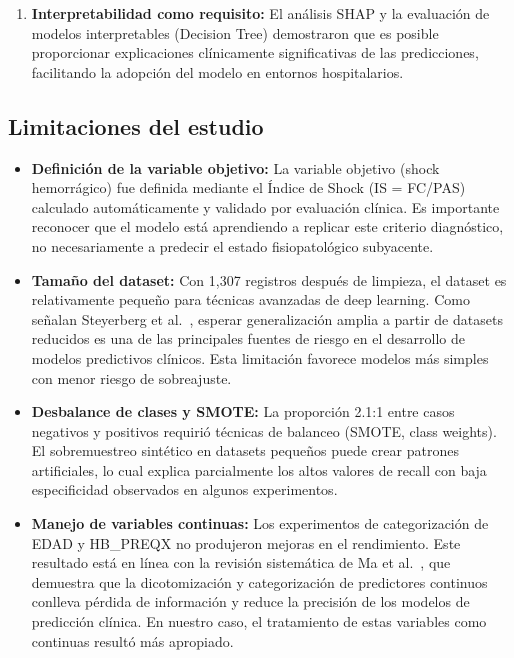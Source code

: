 \documentclass[12pt, letterpaper]{article}
\begin{document}
\begin{enumerate}
    \item \textbf{Interpretabilidad como requisito:} El análisis SHAP y la evaluación de modelos interpretables (Decision Tree) demostraron que es posible proporcionar explicaciones clínicamente significativas de las predicciones, facilitando la adopción del modelo en entornos hospitalarios.
\end{enumerate}

\subsection{Limitaciones del estudio}

\begin{itemize}
    \item \textbf{Definición de la variable objetivo:} La variable objetivo (shock hemorrágico) fue definida mediante el Índice de Shock (IS = FC/PAS) calculado automáticamente y validado por evaluación clínica. Es importante reconocer que el modelo está aprendiendo a replicar este criterio diagnóstico, no necesariamente a predecir el estado fisiopatológico subyacente.
    
    \item \textbf{Tamaño del dataset:} Con 1,307 registros después de limpieza, el dataset es relativamente pequeño para técnicas avanzadas de deep learning. Como señalan Steyerberg et al.\ \cite{steyerberg2018}, esperar generalización amplia a partir de datasets reducidos es una de las principales fuentes de riesgo en el desarrollo de modelos predictivos clínicos. Esta limitación favorece modelos más simples con menor riesgo de sobreajuste.
    
    \item \textbf{Desbalance de clases y SMOTE:} La proporción 2.1:1 entre casos negativos y positivos requirió técnicas de balanceo (SMOTE, class weights). El sobremuestreo sintético en datasets pequeños puede crear patrones artificiales, lo cual explica parcialmente los altos valores de recall con baja especificidad observados en algunos experimentos.
    
    \item \textbf{Manejo de variables continuas:} Los experimentos de categorización de EDAD y HB\_PREQX no produjeron mejoras en el rendimiento. Este resultado está en línea con la revisión sistemática de Ma et al.\ \cite{ma2023}, que demuestra que la dicotomización y categorización de predictores continuos conlleva pérdida de información y reduce la precisión de los modelos de predicción clínica. En nuestro caso, el tratamiento de estas variables como continuas resultó más apropiado.
    

\end{itemize}
\end{document}
